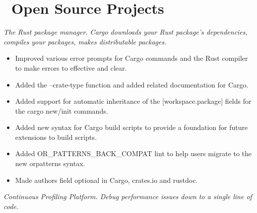 \documentclass{software_engineer_rustin_liu}
\newcommand{\en}[1]{#1}
\newcommand{\zh}[1]{}
\begin{document}
\section{\faGithubAlt\ \en{Open Source Projects}\zh{开源项目}}
\en{}
\zh{\datedsubsection{\textbf{Cargo \& Rust - 活跃贡献者}}{{\href{https://github.com/search?q=repo:rust-lang/cargo+repo:rust-lang/rust+author:hi-rustin&type=commits}{219+ commits}}}}
\en{\textsl{The Rust package manager. Cargo downloads your Rust package’s dependencies, compiles your packages, makes distributable packages.}}
\zh{\textsl{Rust 包管理器，Cargo 下载 Rust 包的依赖，编译包，制作可分发的包。}}

\begin{itemize}
      \item \en{Improved various error prompts for Cargo commands and the Rust compiler to make errors to effective and clear.}
            \zh{改善了大量 Cargo 命令和 Rust 编译器的错误提示，让错误更有效更清晰。}
      \item \en{Added the --crate-type function and added related documentation for Cargo.}
            \zh{为 Cargo 添加了 --crate-type 功能和相关文档。}
      \item \en{Added support for automatic inheritance of the [workspace.package] fields for the cargo new/init commands.}
            \zh{为 cargo new 和 cargo init 命令支持了 [workspace.package] 字段自动继承。}
      \item \en{Added new syntax for Cargo build scripts to provide a foundation for future extensions to build scripts.}
            \zh{为 Cargo 构建脚本添加新的语法，为未来扩展构建脚本提供基础。}
      \item \en{Added OR\_PATTERNS\_BACK\_COMPAT lint to help users migrate to the new or\-patterns syntax.}
            \zh{添加了 OR\_PATTERNS\_BACK\_COMPAT lint 来帮助用户迁移至新的 or\-patterns 语法。}
      \item \en{Made authors field optional in Cargo, crates.io and rustdoc.}
            \zh{使 authors 字段在 Cargo、crates.io 和 rustdoc 中可选。}
\end{itemize}

\en{}
\zh{\datedsubsection{\textbf{pyroscope - 活跃贡献者}}{{\href{https://github.com/grafana/pyroscope/commits?author=hi-rustin}{37+ commits}}}}
\en{\textsl{Continuous Profiling Platform. Debug performance issues down to a single line of code.}}
\zh{\textsl{持续性能分析平台，可将性能问题定位到单行代码。}}
\end{document}
